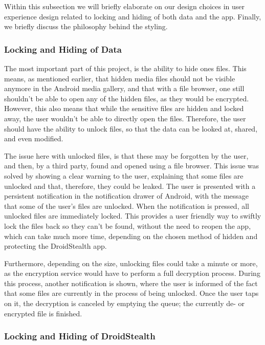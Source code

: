 Within this subsection we will briefly elaborate on our design
choices in user experience design related to locking and hiding
of both data and the app. Finally, we briefly discuss the 
philosophy behind the styling. 

\subsubsection{Locking and Hiding of Data}

The most important part of this project, is the ability to hide
ones files. This means, as mentioned earlier, that hidden media
files should not be visible anymore in the Android media
gallery, and that with a file browser, one still shouldn't be
able to open any of the hidden files, as they would be
encrypted. However, this also means that while the sensitive
files are hidden and locked away, the user wouldn't be able to
directly open the files. Therefore, the user should have the
ability to unlock files, so that the data can be looked at,
shared, and even modified.

The issue here with unlocked files, is that these may be
forgotten by the user, and then, by a third party, found and
opened using a file browser. This issue was solved by showing
a clear warning to the user, explaining that some files are
unlocked and that, therefore, they could be leaked.
The user is presented with a persistent notification in the
notification drawer of Android, with the message that some of
the user's files are unlocked. When the notification is pressed,
all unlocked files are immediately locked. This
provides a user friendly way to swiftly lock the files back so
they can't be found, without the need to reopen the app, which
can take much more time, depending on the chosen method of
hidden and protecting the DroidStealth app. 

Furthermore, depending on the size, unlocking files could take a
minute or more, as the encryption service would have to perform a
full decryption process. During this process, another notification 
is shown, where the user is informed
of the fact that some files are currently in the process of
being unlocked. Once the user taps on it, the decryption is
canceled by emptying the queue; the currently de- or encrypted file is finished.


\subsubsection{Locking and Hiding of DroidStealth}


